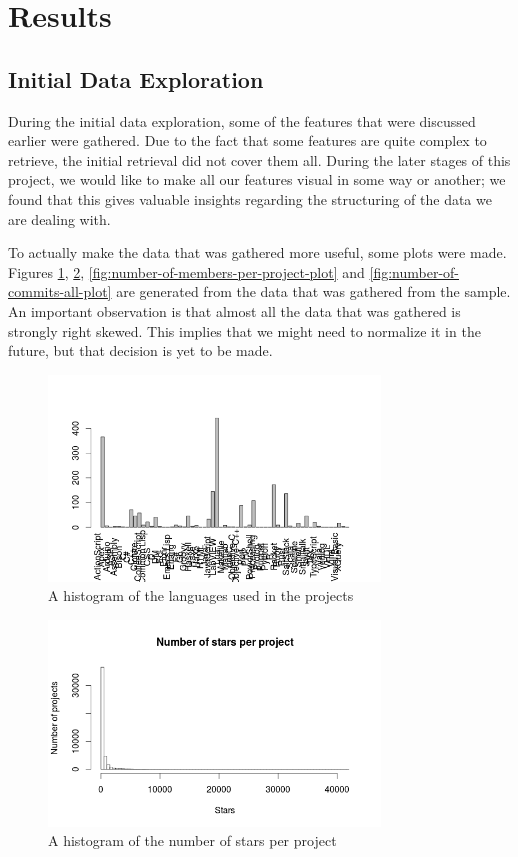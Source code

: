 \section{Results}
    \subsection{Initial Data Exploration}
        During the initial data exploration, some of the features that were discussed earlier were gathered. Due to the fact that some features are quite complex to retrieve, the initial retrieval did not cover them all. During the later stages of this project, we would like to make all our features visual in some way or another; we found that this gives valuable insights regarding the structuring of the data we are dealing with.
        
        To actually make the data that was gathered more useful, some plots were made. 
        Figures \ref{fig:language-frequency-plot}, \ref{fig:star-distribution-plot}, \ref{fig:number-of-members-per-project-plot} and \ref{fig:number-of-commits-all-plot} are generated from the data that was gathered from the sample.
        An important observation is that almost all the data that was gathered is strongly right skewed. %
        This implies that we might need to normalize it in the future, but that decision is yet to be made. 
        
    
	    \begin{figure}
	        \includegraphics[width=250pt]{figures/language-frequency}
	        \caption{A histogram of the languages used in the projects}
	        \label{fig:language-frequency-plot}
	    \end{figure}

	    
	    \begin{figure}
	        \includegraphics[width=250pt]{figures/star-distribution}
	        \caption{A histogram of the  number of stars per project}
	        \label{fig:star-distribution-plot}
	    \end{figure}
	    

